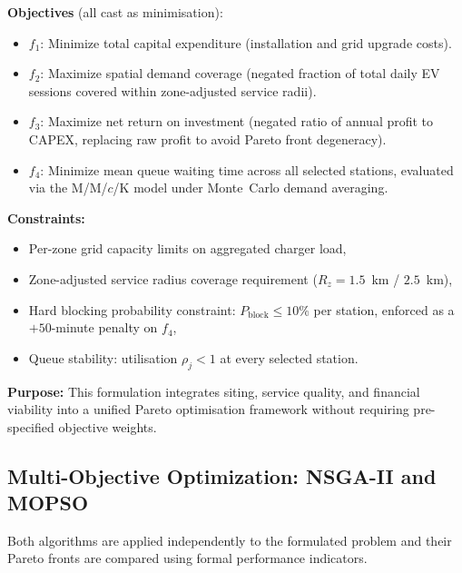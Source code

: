 \textbf{Objectives} (all cast as minimisation):
\begin{itemize}
    \item $f_1$: Minimize total capital expenditure (installation
          and grid upgrade costs).
    \item $f_2$: Maximize spatial demand coverage (negated fraction
          of total daily EV sessions covered within zone-adjusted
          service radii).
    \item $f_3$: Maximize net return on investment (negated ratio
          of annual profit to CAPEX, replacing raw profit to avoid
          Pareto front degeneracy).
    \item $f_4$: Minimize mean queue waiting time across all selected
          stations, evaluated via the M/M/$c$/K model under
          Monte~Carlo demand averaging.
\end{itemize}

\textbf{Constraints:}
\begin{itemize}
    \item Per-zone grid capacity limits on aggregated charger load,
    \item Zone-adjusted service radius coverage requirement
          ($R_z = 1.5$~km / $2.5$~km),
    \item Hard blocking probability constraint: $P_{\text{block}}
          \leq 10\%$ per station, enforced as a $+50$-minute
          penalty on $f_4$,
    \item Queue stability: utilisation $\rho_j < 1$ at every
          selected station.
\end{itemize}

\noindent\textbf{Purpose:} This formulation integrates siting,
service quality, and financial viability into a unified Pareto
optimisation framework without requiring pre-specified objective
weights.

\subsection{Multi-Objective Optimization: NSGA-II and MOPSO}
Both algorithms are applied independently to the formulated problem
and their Pareto fronts are compared using formal performance
indicators.

